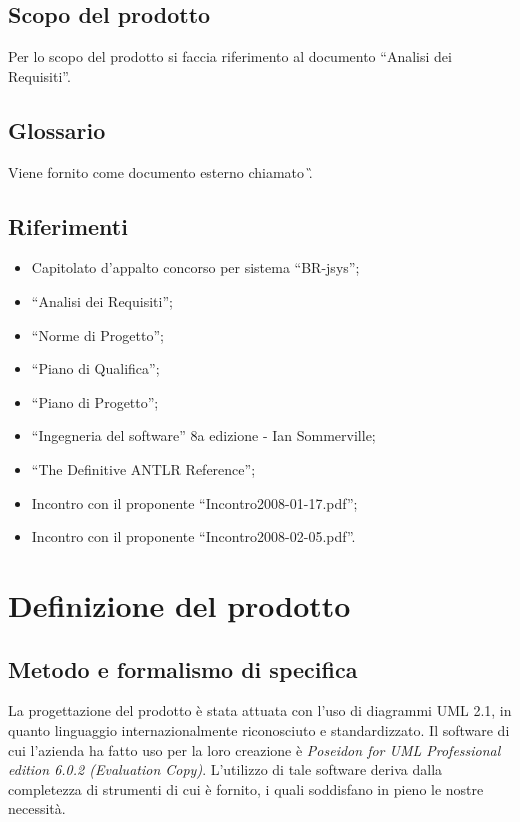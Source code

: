 \section{Scopo del prodotto}
Per lo scopo del prodotto si faccia riferimento al documento ``Analisi dei Requisiti''.
\section{Glossario}
Viene fornito come documento esterno chiamato \G .
\section{Riferimenti}
\begin{itemize}
\item Capitolato d'appalto concorso per sistema ``BR-jsys'';
\item ``Analisi dei Requisiti'';
\item ``Norme di Progetto'';
\item ``Piano di Qualifica'';
\item ``Piano di Progetto'';
\item ``Ingegneria del software'' 8a edizione - Ian Sommerville;
\item ``The Definitive ANTLR Reference'';
\item Incontro con il proponente ``Incontro2008-01-17.pdf'';
\item Incontro con il proponente ``Incontro2008-02-05.pdf''.
\end{itemize}


\chapter{Definizione del prodotto}
\section{Metodo e formalismo di specifica}
La progettazione del prodotto \`e stata attuata con l'uso di diagrammi UML 2.1, in quanto linguaggio internazionalmente riconosciuto e standardizzato.
Il software di cui l'azienda ha fatto uso per la loro creazione \`e \textit{Poseidon for UML Professional edition 6.0.2 (Evaluation Copy)}. L'utilizzo di tale software deriva dalla completezza
di strumenti di cui \`e fornito, i quali soddisfano in pieno le nostre necessit\`a.

